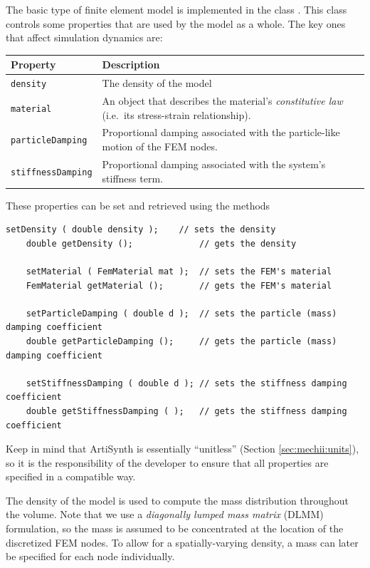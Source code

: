 The basic type of finite element model is implemented in the class 
.  This class controls some
properties that are used by the model as a whole.  The key ones that affect
simulation dynamics are:
\begin{center}
	\begin{tabular}{|ll|}
		\hline
		Property & Description\\
		\hline
		{\tt density} & The density of the model\\
		{\tt material} & An object that describes the material's 
		    \emph{constitutive law} (i.e.~its stress-strain relationship).\\
		{\tt particleDamping} & Proportional damping associated with the 
		    particle-like motion of the FEM nodes.\\
		{\tt stiffnessDamping} & Proportional damping associated with the 
		    system's stiffness term.\\
		\hline
	\end{tabular}
\end{center}
These properties can be set and retrieved using the methods
\begin{lstlisting}[]
	setDensity ( double density );    // sets the density
	double getDensity ();             // gets the density

	setMaterial ( FemMaterial mat );  // sets the FEM's material
	FemMaterial getMaterial ();       // gets the FEM's material

	setParticleDamping ( double d );  // sets the particle (mass) damping coefficient
	double getParticleDamping ();     // gets the particle (mass) damping coefficient

	setStiffnessDamping ( double d ); // sets the stiffness damping coefficient
	double getStiffnessDamping ( );   // gets the stiffness damping coefficient
\end{lstlisting}
Keep in mind that ArtiSynth is essentially ``unitless'' (Section 
\ref{sec:mechii:units}), so it is the responsibility of the developer to
ensure that all properties are specified in a compatible way.  

The density of the model is used to compute the mass distribution throughout
the volume.  Note that we use a \emph{diagonally lumped mass matrix} (DLMM)
formulation, so the mass is assumed to be concentrated at the location of
the discretized FEM nodes.  To allow for a spatially-varying density,
a mass can later be specified for each node individually.

